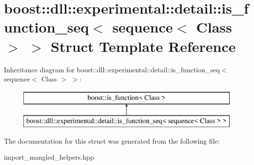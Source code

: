 \hypertarget{a00170}{}\section{boost\+:\+:dll\+:\+:experimental\+:\+:detail\+:\+:is\+\_\+function\+\_\+seq$<$ sequence$<$ Class $>$ $>$ Struct Template Reference}
\label{a00170}
Inheritance diagram for boost\+:\+:dll\+:\+:experimental\+:\+:detail\+:\+:is\+\_\+function\+\_\+seq$<$ sequence$<$ Class $>$ $>$\+:\begin{figure}[H]
\begin{center}
\leavevmode
\includegraphics[height=2.000000cm]{a00170}
\end{center}
\end{figure}


The documentation for this struct was generated from the following file\+:\begin{DoxyCompactItemize}
\item 
import\+\_\+mangled\+\_\+helpers.\+hpp\end{DoxyCompactItemize}
